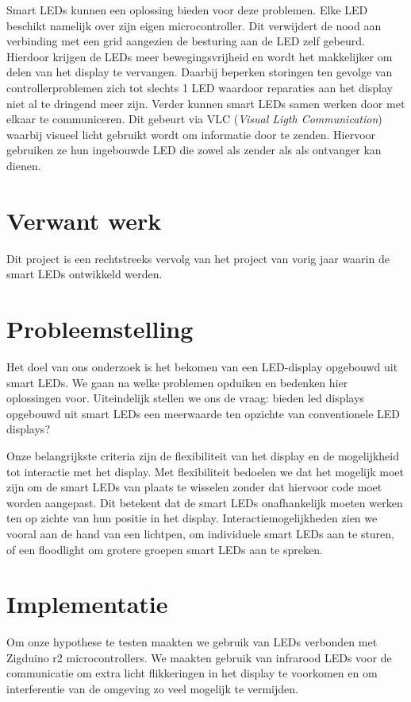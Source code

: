 \documentclass{article}
\begin{document}
Smart LEDs kunnen een oplossing bieden voor deze problemen. Elke LED beschikt namelijk over zijn eigen microcontroller. Dit verwijdert de nood aan verbinding met een grid aangezien de besturing aan de LED zelf gebeurd. Hierdoor krijgen de LEDs meer bewegingsvrijheid en wordt het makkelijker om delen van het display te vervangen. Daarbij beperken storingen ten gevolge van controllerproblemen zich tot slechts 1 LED waardoor reparaties aan het display niet al te dringend meer zijn.  Verder kunnen smart LEDs samen werken door met elkaar te communiceren. Dit gebeurt via VLC (\textit{Visual Ligth Communication}) waarbij visueel licht gebruikt wordt om informatie door te zenden\cite{VLC}. Hiervoor gebruiken ze hun ingebouwde LED die zowel als zender als als ontvanger kan dienen. 


\section{Verwant werk}
Dit project is een rechtstreeks vervolg van het project van vorig jaar waarin de smart LEDs ontwikkeld werden. 



\section{Probleemstelling}

Het doel van ons onderzoek is het bekomen van een LED-display opgebouwd uit smart LEDs. We gaan na welke problemen opduiken en bedenken hier oplossingen voor. Uiteindelijk stellen we ons de vraag: bieden led displays opgebouwd uit smart LEDs een meerwaarde ten opzichte van conventionele LED displays?

Onze belangrijkste criteria zijn de flexibiliteit van het display en de mogelijkheid tot interactie met het display. Met flexibiliteit bedoelen we dat het mogelijk moet zijn om de smart LEDs van plaats te wisselen zonder dat hiervoor code moet worden aangepast. Dit betekent dat de smart LEDs onafhankelijk moeten werken ten op zichte van hun positie in het display. Interactiemogelijkheden zien we vooral aan de hand van een lichtpen, om individuele smart LEDs aan te sturen, of een floodlight om grotere groepen smart LEDs aan te spreken.


\section{Implementatie}
Om onze hypothese te testen maakten we gebruik van LEDs verbonden met Zigduino r2 microcontrollers. We maakten gebruik van infrarood LEDs voor de communicatie om extra licht flikkeringen in het display te voorkomen en om interferentie van de omgeving zo veel mogelijk te vermijden.
\end{document}
